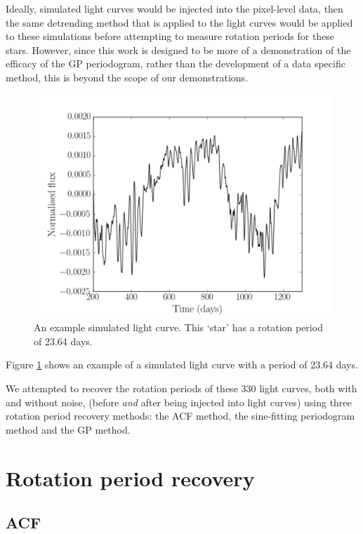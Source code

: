 Ideally, simulated light curves would be injected into the pixel-level data,
then the same detrending method that is applied to the \kepler light curves
would be applied to these simulations before attempting to measure rotation
periods for these stars.
However, since this work is designed to be more of a demonstration of the
efficacy of the GP periodogram, rather than the development of a \Kepler data
specific method, this is beyond the scope of our demonstrations.
\begin{figure}
\begin{center}
\includegraphics[width=6in, clip=true]{figures/thesis_plot.pdf}
\caption{An example simulated light curve. This `star' has a rotation period
of 23.64 days.}
\label{fig:noise-free_lc}
\end{center}
\end{figure}
Figure \ref{fig:noise-free_lc} shows an example of a simulated light curve
with a period of 23.64 days.

We attempted to recover the rotation periods of these 330 light curves, both
with and without noise, (\ie before {\it and} after being injected into
\kepler light curves) using three rotation period recovery methods: the ACF
method, the sine-fitting periodogram method and the GP method.

\section{Rotation period recovery}

\subsection{ACF}

